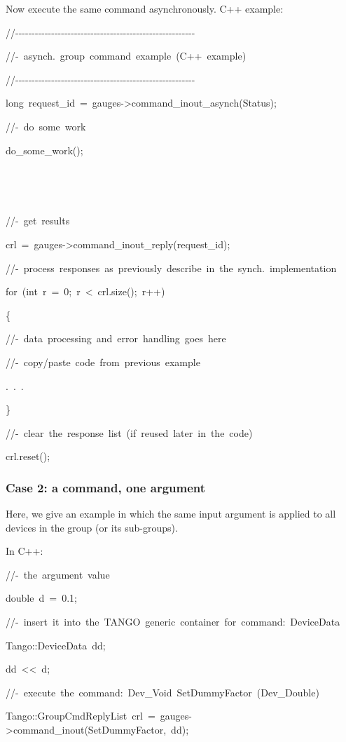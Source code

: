 Now execute the same command asynchronously. C++ example:


\begin{lyxcode}
//-{}-{}-{}-{}-{}-{}-{}-{}-{}-{}-{}-{}-{}-{}-{}-{}-{}-{}-{}-{}-{}-{}-{}-{}-{}-{}-{}-{}-{}-{}-{}-{}-{}-{}-{}-{}-{}-{}-{}-{}-{}-{}-{}-{}-{}-{}-{}-{}-{}-{}-{}-{}-{}-{}-

//-~asynch.~group~command~example~(C++~example)

//-{}-{}-{}-{}-{}-{}-{}-{}-{}-{}-{}-{}-{}-{}-{}-{}-{}-{}-{}-{}-{}-{}-{}-{}-{}-{}-{}-{}-{}-{}-{}-{}-{}-{}-{}-{}-{}-{}-{}-{}-{}-{}-{}-{}-{}-{}-{}-{}-{}-{}-{}-{}-{}-{}-

long~request\_id~=~gauges->command\_inout\_asynch(\textquotedbl{}Status\textquotedbl{});

//-~do~some~work

do\_some\_work();

~

~

//-~get~results

crl~=~gauges->command\_inout\_reply(request\_id);

//-~process~responses~as~previously~describe~in~the~synch.~implementation

for~(int~r~=~0;~r~<~crl.size();~r++)

\{

//-~data~processing~and~error~handling~goes~here

//-~copy/paste~code~from~previous~example

.~.~.

\}

//-~clear~the~response~list~(if~reused~later~in~the~code)

crl.reset();
\end{lyxcode}



\subsubsection{Case 2: a command, one argument\label{sub:Case-2} }

Here, we give an example in which the same input argument is applied
to all devices in the group (or its sub-groups). 

In C++:


\begin{lyxcode}
//-~the~argument~value

double~d~=~0.1;

//-~insert~it~into~the~TANGO~generic~container~for~command:~DeviceData

Tango::DeviceData~dd;

dd~<\textcompwordmark{}<~d;

//-~execute~the~command:~Dev\_Void~SetDummyFactor~(Dev\_Double)

Tango::GroupCmdReplyList~crl~=~gauges->command\_inout(\textquotedbl{}SetDummyFactor\textquotedbl{},~dd);
\end{lyxcode}



